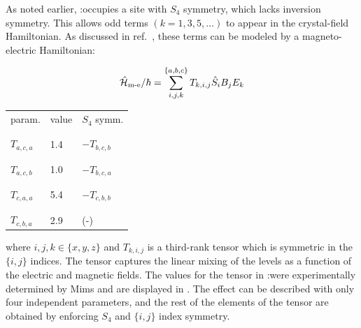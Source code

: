 As noted earlier, \Er:\Ca occupies a site with $S_4$ symmetry, which lacks inversion symmetry. This allows odd terms $(k=1,3,5,\dots)$ to appear in the crystal-field Hamiltonian. As discussed in ref.~, these terms can be modeled by a magneto-electric Hamiltonian:

\begin{equation}
    \hat{\mathcal{H}}_{\text{m-e}} / \hbar = \sum_{i,j,k}^{\{a,b,c\}} T_{k, i, j} \hat{S}_{i} B_j E_k
\end{equation}

\begin{margintable}
\centering
\begin{tabular}{l|l|l}
param.         & value  & $S_4$ symm.   \\[-1em] \\ \hline \\[-1em]
$T_{a,c,a}$    & 1.4    & $-T_{b,c,b}$  \\[-1em] \\ \hline \\[-1em]
$T_{a,c,b}$    & 1.0    & $-T_{b,c,a}$  \\[-1em] \\ \hline \\[-1em]
$T_{c,a,a}$    & 5.4    & $-T_{c,b,b}$  \\[-1em] \\ \hline \\[-1em]
$T_{c,b,a}$    & 2.9    &  (-) 
\end{tabular}
\caption[Magneto-optic parameters]{Magneto-electric parameters for \Er:\Ca given in ($10^{-32} \times \frac{\text{J/T}}{\text{V/m}}$). The values were measured by Mims in ref.~\cite{mims_electric_1965}. The third column indicates the relation between the parameters that originate from the $S_4$ symmetry of the ion site. The rest of the values of the tensor can be obtained by enforcing $\{i, j\}$ index symmetry $T_{k, i, j} = T_{k, j, i}$.}
\end{margintable}

where $i,j,k \in\{x,y,z\}$ and $T_{k, i, j}$ is a third-rank tensor which is symmetric in the $\{i, j\}$ indices. The tensor captures the linear mixing of the levels as a function of the electric and magnetic fields. The values for the tensor in \Er:\Ca were experimentally determined by Mims  and are displayed in . The effect can be described with only four independent parameters, and the rest of the elements of the tensor are obtained by enforcing $S_4$ and $\{i, j\}$ index symmetry.

